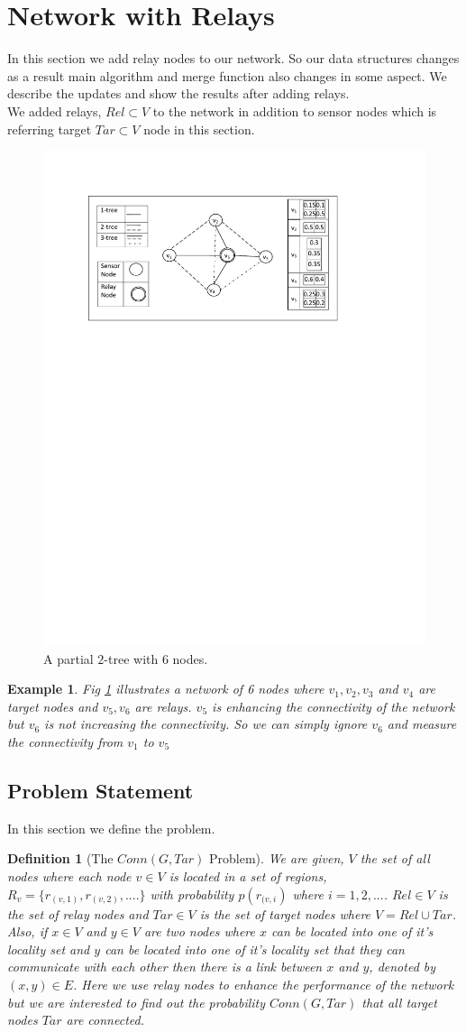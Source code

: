 \documentclass[11pt]{article}
\newtheorem*{defi}{Definition}
\newtheorem{exmp}{Example}[section]
\begin{document}
\section{Network with Relays}
In this section we add relay nodes to our network. So our data structures changes as a result main algorithm and merge function also changes in some aspect. We describe the updates and show the results after adding relays.\\
We added relays, $Rel\subset V$ to the network in addition to sensor nodes which is referring target $Tar\subset V$ node in this section.
\begin{figure}[h]
\label{fig:relay1}
\centering
\includegraphics[width=6 in, height=2.5 in]{Relay.pdf}
 \caption{A partial \(2\)-tree with \(6\) nodes.
}
\end{figure}
\begin{exmp}
\normalfont
Fig \ref{fig:relay1} illustrates a network of 6 nodes where $v_1,v_2,v_3$ and $v_4$ are target nodes and $v_5, v_6$ are relays. $v_5$ is enhancing the connectivity of the network but $v_6$ is not  increasing the connectivity. So we can simply ignore $v_6$ and measure the connectivity from $v_1$ to $v_5$
\end{exmp}
\subsection{Problem Statement}
In this section we define the problem.
\begin{defi}[The $Conn(G,Tar)$ Problem]
\normalfont
We are given, $V$ the set of all nodes where each node $v\in V$ is located in a set of regions, $R_v=\{r_{(v,1)},r_{(v,2)},....\}$  with probability $p(r_{(v,i})$ where $i=1,2,...$.
$Rel\in V$ is the set of relay nodes and $Tar\in V$ is the set of target nodes where $V=Rel\cup Tar$. Also, if $x\in V$ and $y\in V$ are two nodes where $x$ can be located into one of it's locality set and $y$ can be located into one of it's locality set that they can communicate with each other then there is a link between $x$ and $y$, denoted by $(x,y)\in E$. Here we use relay nodes to enhance the performance of the network but we are interested to find out the probability $Conn(G,Tar)$ that all target nodes $Tar$ are connected.
\end{defi}
\end{document}
